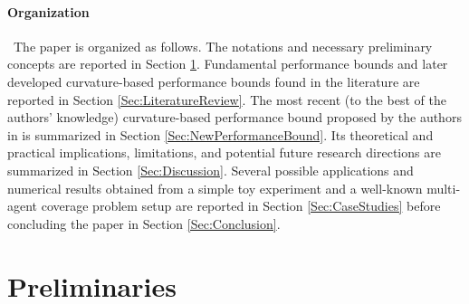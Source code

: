 \documentclass[letterpaper, 10 pt, conference]{ieeeconf}
\begin{document}

\paragraph*{Organization}\ 
The paper is organized as follows. The notations and necessary preliminary concepts are reported in Section \ref{Sec:PreliminariesAndNotation}. Fundamental performance bounds and later developed curvature-based performance bounds found in the literature are reported in Section \ref{Sec:LiteratureReview}. 
The most recent (to the best of the authors' knowledge) curvature-based performance bound proposed by the authors in \cite{WelikalaJ02021} is summarized in Section \ref{Sec:NewPerformanceBound}. Its theoretical and practical implications, limitations, and potential future research directions are summarized in Section \ref{Sec:Discussion}. 
Several possible applications and numerical results obtained from a simple toy experiment and a well-known multi-agent coverage problem setup \cite{Welikala2019J1} are reported in Section \ref{Sec:CaseStudies} before concluding the paper in Section \ref{Sec:Conclusion}. 



\section{Preliminaries}
\label{Sec:PreliminariesAndNotation}
\end{document}
